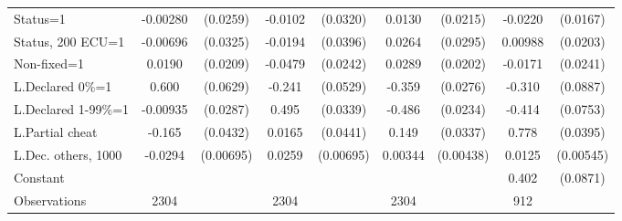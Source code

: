 \begin{tabular}{l|cccccc|cc}
Status=1        & -0.00280         & (0.0259)&  -0.0102         & (0.0320)&   0.0130         & (0.0215)&  -0.0220         & (0.0167)\\
Status, 200 ECU=1& -0.00696         & (0.0325)&  -0.0194         & (0.0396)&   0.0264         & (0.0295)&  0.00988         & (0.0203)\\
Non-fixed=1     &   0.0190         & (0.0209)&  -0.0479\sym{**} & (0.0242)&   0.0289         & (0.0202)&  -0.0171         & (0.0241)\\
L.Declared 0\%=1&    0.600\sym{***}& (0.0629)&   -0.241\sym{***}& (0.0529)&   -0.359\sym{***}& (0.0276)&   -0.310\sym{***}& (0.0887)\\
L.Declared 1-99\%=1& -0.00935         & (0.0287)&    0.495\sym{***}& (0.0339)&   -0.486\sym{***}& (0.0234)&   -0.414\sym{***}& (0.0753)\\
L.Partial cheat &   -0.165\sym{***}& (0.0432)&   0.0165         & (0.0441)&    0.149\sym{***}& (0.0337)&    0.778\sym{***}& (0.0395)\\
L.Dec. others, 1000&  -0.0294\sym{***}&(0.00695)&   0.0259\sym{***}&(0.00695)&  0.00344         &(0.00438)&   0.0125\sym{**} &(0.00545)\\
Constant        &                  &         &                  &         &                  &         &    0.402\sym{***}& (0.0871)\\
\hline
Observations    &     2304         &         &     2304         &         &     2304         &         &      912         &         \\


\end{tabular}
